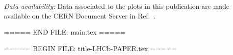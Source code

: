 \renewcommand{\thefootnote}{\fnsymbol{footnote}}
\setcounter{footnote}{1}





\renewcommand{\thefootnote}{\arabic{footnote}}
\setcounter{footnote}{0}






\cleardoublepage






\pagestyle{plain}
\setcounter{page}{1}








\vspace{\baselineskip}
\emph{Data availability:} Data associated to the plots in this publication are made available on the CERN Document Server in Ref.~\cite{LHCb-PAPER-2025-056-cds}.


\clearpage







\newpage





===== END FILE: main.tex =====

===== BEGIN FILE: title-LHCb-PAPER.tex =====









